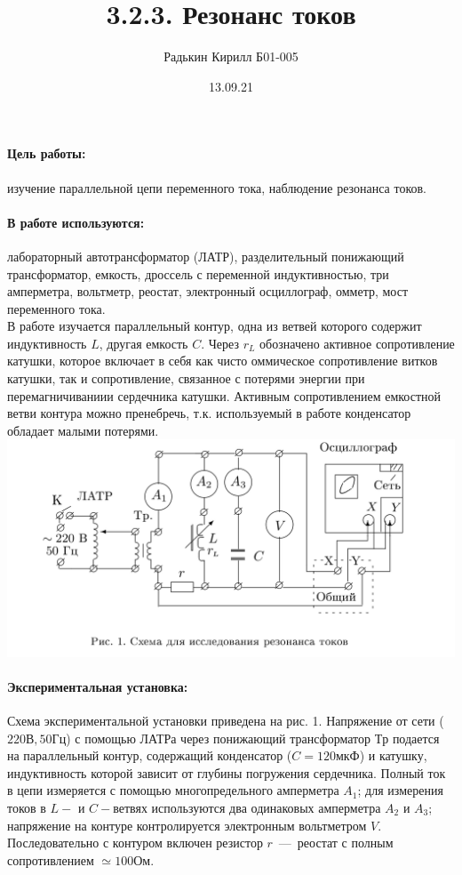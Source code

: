 \documentclass[a4paper, 12pt]{article}
\author{Радькин Кирилл Б01-005}
\title{3.2.3. Резонанс токов}
\date{13.09.21}
\newcommand{\parag}[1]{\paragraph*{#1:}}
\begin{document}
\maketitle

\parag {Цель работы} изучение параллельной цепи переменного тока, наблюдение резонанса токов.

\parag {В работе используются} лабораторный автотрансформатор (ЛАТР), разделительный понижающий трансформатор, емкость, дроссель с переменной индуктивностью, три амперметра, вольтметр, реостат, электронный осциллограф, омметр, мост переменного тока.
\\

В работе изучается параллельный контур, одна из ветвей которого содержит индуктивность $L$, другая емкость $C$. Через $r_L$ обозначено активное сопротивление катушки, которое включает в себя как чисто оммическое сопротивление витков катушки, так и сопротивление, связанное с потерями энергии при перемагничиваниии сердечника катушки. Активным сопротивлением емкостной ветви контура можно пренебречь, т.к. используемый в работе конденсатор обладает малыми потерями.
\\

\includegraphics[scale=0.2]{ust.png}
\\

\parag {Экспериментальная установка} Схема экспериментальной установки приведена на рис. 1. Напряжение от сети ($220 В, 50 Гц$) с помощью ЛАТРа через понижающий трансформатор $Тр$ подается на параллельный контур, содержащий конденсатор ($C = 120 мкФ$) и катушку, индуктивность которой зависит от глубины погружения сердечника. Полный ток в цепи измеряется с помощью многопредельного амперметра $A_1$; для измерения токов в $L-$ и $C-$ветвях используются два одинаковых амперметра $A_2$ и $A_3$; напряжение на контуре контролируется электронным вольтметром $V$. Последовательно с контуром включен резистор $r$~---~реостат с полным сопротивлением $\simeq 100 Ом$.
\end{document}
